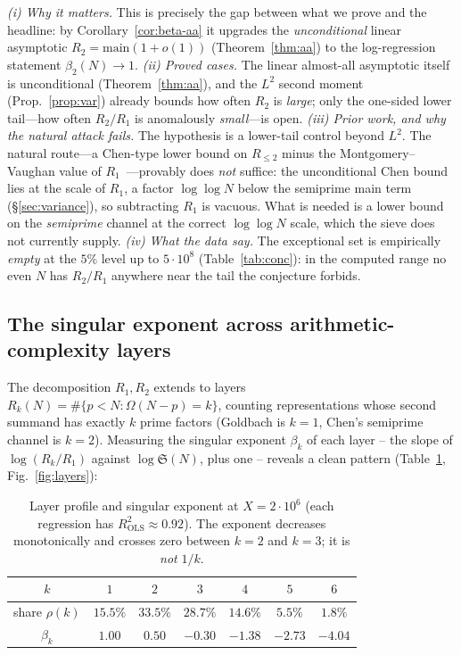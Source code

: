 \documentclass[]{interact}%
\newcommand{\OmegaF}{\Omega}
\newcommand{\sing}{\mathfrak S}
\begin{document}
\noindent\emph{(i) Why it matters.} This is precisely the gap between what we prove and the
headline: by Corollary~\ref{cor:beta-aa} it upgrades the \emph{unconditional} linear asymptotic
$R_2=\mathrm{main}(1+o(1))$ (Theorem~\ref{thm:aa}) to the log-regression statement
$\beta_2(N)\to1$. \emph{(ii) Proved cases.} The linear almost-all asymptotic itself is
unconditional (Theorem~\ref{thm:aa}), and the $L^2$ second moment (Prop.~\ref{prop:var}) already
bounds how often $R_2$ is \emph{large}; only the one-sided lower tail---how often $R_2/R_1$ is
anomalously \emph{small}---is open. \emph{(iii) Prior work, and why the natural attack fails.} The
hypothesis is a lower-tail control beyond $L^2$. The natural route---a Chen-type lower bound on
$R_{\le2}$ minus the Montgomery--Vaughan value of $R_1$~\citep{chen1973,montgomeryvaughan1975}---provably
does \emph{not} suffice: the unconditional Chen bound lies at the scale of $R_1$, a factor
$\log\log N$ below the semiprime main term (\S\ref{sec:variance}), so subtracting $R_1$ is vacuous.
What is needed is a lower bound on the \emph{semiprime} channel at the correct $\log\log N$ scale,
which the sieve does not currently supply. \emph{(iv) What the data say.} The exceptional set is
empirically \emph{empty} at the $5\%$ level up to $5\cdot10^{8}$ (Table~\ref{tab:conc}): in the
computed range no even $N$ has $R_2/R_1$ anywhere near the tail the conjecture forbids.

\subsection{The singular exponent across arithmetic-complexity layers}
\label{sec:layers-emp}

The decomposition $R_1,R_2$ extends to layers $R_k(N)=\#\{p<N:\OmegaF(N-p)=k\}$,
counting representations whose second summand has exactly $k$ prime factors
(Goldbach is $k=1$, Chen's semiprime channel is $k=2$). Measuring the singular
exponent $\beta_k$ of each layer -- the slope of $\log(R_k/R_1)$ against
$\log\sing(N)$, plus one -- reveals a clean pattern (Table~\ref{tab:layers},
Fig.~\ref{fig:layers}):

\begin{table}[h]
\centering
\begin{tabular}{ccccccc}
\toprule
$k$ & $1$ & $2$ & $3$ & $4$ & $5$ & $6$\\
\midrule
share $\rho(k)$ & $15.5\%$ & $33.5\%$ & $28.7\%$ & $14.6\%$ & $5.5\%$ & $1.8\%$\\
$\beta_k$ & $1.00$ & $0.50$ & $-0.30$ & $-1.38$ & $-2.73$ & $-4.04$\\
\bottomrule
\end{tabular}
\caption{Layer profile and singular exponent at $X=2\cdot10^{6}$ (each regression has
$R^2_{\mathrm{OLS}}\approx0.92$). The exponent decreases monotonically and crosses zero between
$k=2$ and $k=3$; it is \emph{not} $1/k$.}
\label{tab:layers}
\end{table}
\end{document}
